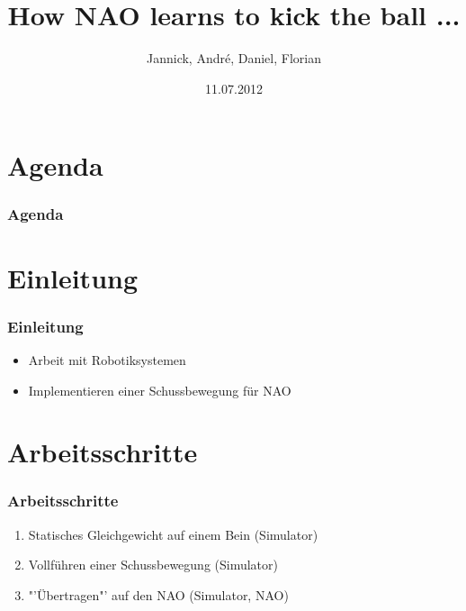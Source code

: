 \documentclass[]{beamer}
\title{How NAO learns to kick the ball ...}
\author{Jannick, André, Daniel, Florian}
\date{11.07.2012}
\begin{document}
\begin{frame}
	\titlepage
\end{frame}

\section*{Agenda}
\begin{frame}
	\frametitle{Agenda}
  	\tableofcontents
\end{frame}

\section{Einleitung}
\begin{frame}
	\frametitle{Einleitung}
	\begin{itemize}
		\item Arbeit mit Robotiksystemen
		\item Implementieren einer Schussbewegung für NAO
	\end{itemize}		
\end{frame}

\section{Arbeitsschritte}
\begin{frame}
	\frametitle{Arbeitsschritte}
	\begin{enumerate}
		\item Statisches Gleichgewicht auf einem Bein (Simulator)
		\item Vollführen einer Schussbewegung (Simulator)
		\item "'Übertragen"' auf den NAO (Simulator, NAO)
	\end{enumerate}
\end{frame}
\end{document}
